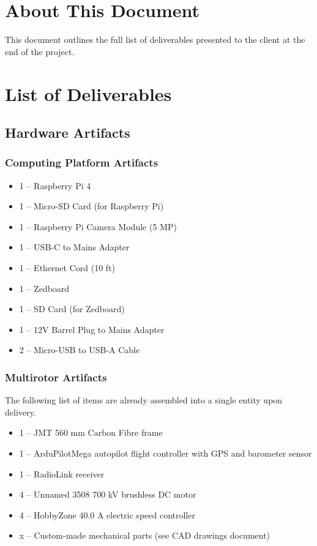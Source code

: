 \documentclass[10pt,letterpaper]{article}
\begin{document}

\section{About This Document}
This document outlines the full list of deliverables presented to the client at the end of the project.

\section{List of Deliverables}
\subsection{Hardware Artifacts}
\subsubsection{Computing Platform Artifacts}
\begin{itemize}
\item 1 -- Raspberry Pi 4
\item 1 -- Micro-SD Card (for Raspberry Pi)
\item 1 -- Raspberry Pi Camera Module (5 MP)
\item 1 -- USB-C to Mains Adapter
\item 1 -- Ethernet Cord (10 ft)
\item 1 -- Zedboard
\item 1 -- SD Card (for Zedboard)
\item 1 -- 12V Barrel Plug to Mains Adapter
\item 2 -- Micro-USB to USB-A Cable
\end{itemize}

\subsubsection{Multirotor Artifacts}

The following list of items are already assembled into a single entity upon delivery. 

\begin{itemize}
\item 1 -- JMT 560 mm Carbon Fibre frame
\item 1 -- ArduPilotMega autopilot flight controller with GPS and barometer sensor
\item 1 -- RadioLink receiver
\item 4 -- Unnamed 3508 700 kV brushless DC motor
\item 4 -- HobbyZone 40.0 A electric speed controller
\item x -- Custom-made mechanical parts (see CAD drawings document)
\end{itemize}
\end{document}
